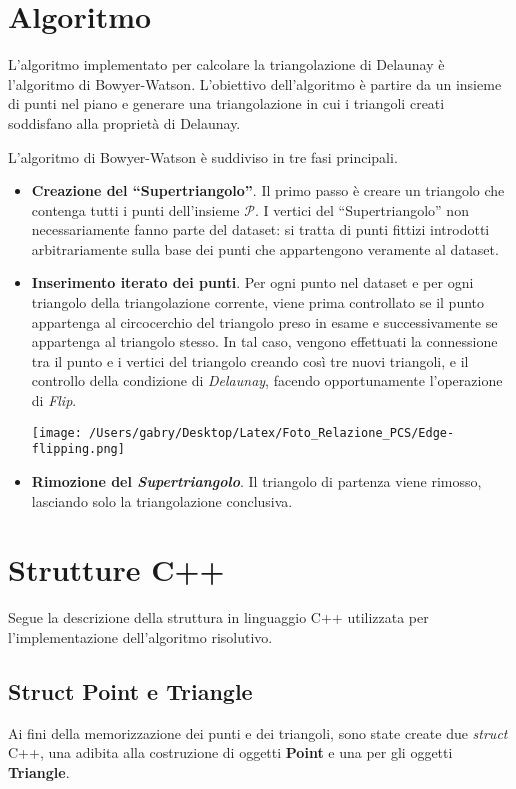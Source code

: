 \documentclass{article}
\begin{document}
\section{Algoritmo}
L'algoritmo implementato per calcolare la triangolazione di Delaunay è l'algoritmo di Bowyer-Watson.
L'obiettivo dell'algoritmo è partire da un insieme di punti nel piano e generare una triangolazione in cui i triangoli creati soddisfano alla proprietà di Delaunay.  

\noindent L'algoritmo di Bowyer-Watson è suddiviso in tre fasi principali.
\begin{itemize}
\item \textbf{Creazione del \enquote{Supertriangolo}}.  Il primo passo è creare un triangolo che contenga tutti i punti dell'insieme $\mathcal{P}$.  I vertici del \enquote{Supertriangolo} non necessariamente fanno parte del dataset: si tratta di punti fittizi introdotti arbitrariamente sulla base dei punti che appartengono veramente al dataset.  

\item \textbf{Inserimento iterato dei punti}.  Per ogni punto nel dataset e per ogni triangolo della triangolazione corrente,  viene prima controllato se il punto appartenga al circocerchio del triangolo preso in esame e successivamente se appartenga al triangolo stesso.  In tal caso,  vengono effettuati la connessione tra il punto e i vertici del triangolo creando così tre nuovi triangoli,  e il controllo della condizione di \emph{Delaunay},  facendo opportunamente l'operazione di \emph{Flip}.

\begin{center}
\texttt{[image: /Users/gabry/Desktop/Latex/Foto\_Relazione\_PCS/Edge-flipping.png]}
\end{center}

\item \textbf{Rimozione del \emph{Supertriangolo}}.  Il triangolo di partenza viene rimosso,  lasciando solo la triangolazione conclusiva.
\end{itemize}

\section{Strutture C++}
Segue la descrizione della struttura in linguaggio C++ utilizzata per l'implementazione dell'algoritmo risolutivo.

\subsection{Struct Point e Triangle}
Ai fini della memorizzazione dei punti e dei triangoli,  sono state create due \emph{struct} C++,  una adibita alla costruzione di oggetti \textbf{Point} e una per gli oggetti \textbf{Triangle}.  \\
\end{document}
